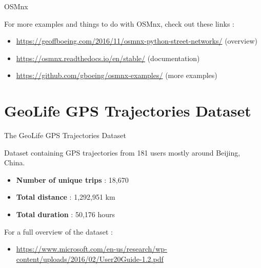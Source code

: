 \documentclass[aspectratio=169]{beamer}
\begin{document}
\begin{frame}{OSMnx \cite{boeing2017osmnx}}

{\Large For more examples and things to do with OSMnx, check out these links :}
\vspace{1cm}
\begin{itemize}
	\item \url{https://geoffboeing.com/2016/11/osmnx-python-street-networks/} (overview)
	\item \url{https://osmnx.readthedocs.io/en/stable/} (documentation)
	\item \url{https://github.com/gboeing/osmnx-examples/} (more examples)
\end{itemize}

\end{frame}


\section{GeoLife GPS Trajectories Dataset}

\begin{frame}{The GeoLife GPS Trajectories Dataset \cite{zheng2008understanding, zheng2010geolife, zheng2009mining}}

Dataset containing GPS trajectories from 181 users mostly around Beijing, China.
\begin{itemize}
	\item \textbf{Number of unique trips} : 18,670
	\item \textbf{Total distance} : 1,292,951 km
	\item \textbf{Total duration} : 50,176 hours
\end{itemize}
\vspace{.5cm}
For a full overview of the dataset :
\begin{itemize}
	\item \url{https://www.microsoft.com/en-us/research/wp-content/uploads/2016/02/User20Guide-1.2.pdf}
\end{itemize}

\end{frame}

\end{document}
